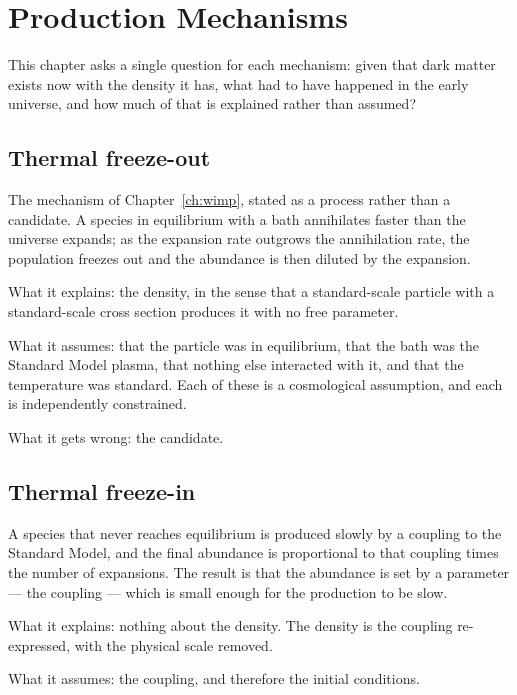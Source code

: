
\chapter{Production Mechanisms}
\label{ch:production}

This chapter asks a single question for each mechanism: given that dark
matter exists now with the density it has, what had to have happened in the
early universe, and how much of that is explained rather than assumed?

\section{Thermal freeze-out}The mechanism of Chapter~\ref{ch:wimp}, stated as a
process rather than a candidate. A species in equilibrium with a bath
annihilates faster than the universe expands; as the expansion rate
outgrows the annihilation rate, the population freezes out and the
abundance is then diluted by the expansion.

What it explains: the density, in the sense that a standard-scale particle
with a standard-scale cross section produces it with no free parameter.

What it assumes: that the particle was in equilibrium, that the bath was the
Standard Model plasma, that nothing else interacted with it, and that the
temperature was standard. Each of these is a cosmological assumption, and
each is independently constrained.

What it gets wrong: the candidate.

\section{Thermal freeze-in}A species that never reaches equilibrium is produced
slowly by a coupling to the Standard Model, and the final abundance is
proportional to that coupling times the number of expansions. The result is
that the abundance is set by a parameter --- the coupling --- which is small
enough for the production to be slow.

What it explains: nothing about the density. The density is the coupling
re-expressed, with the physical scale removed.

What it assumes: the coupling, and therefore the initial conditions.

